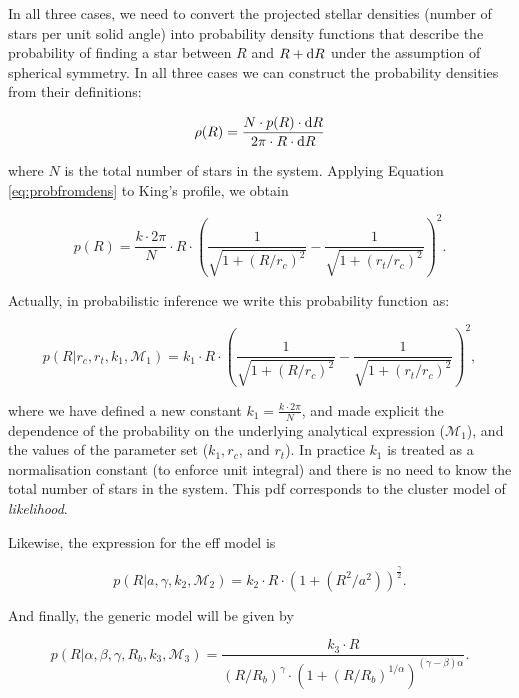 In all three cases, we need to convert the projected stellar densities (number of stars per unit solid angle) into probability density functions that describe the probability of finding a star between $R$ and $R+{\rm d}R$ under the assumption of spherical symmetry. In all three cases we can construct the probability densities from their definitions:

\begin{equation}
\rho(R)=\frac{N\cdot p(R)\cdot {\rm d}R}{2\pi\cdot R\cdot {\rm d}R}
\label{eq:probfromdens}
\end{equation}

where $N$ is the total number of stars in the system. Applying Equation \ref{eq:probfromdens} to King's profile, we obtain

\begin{equation}
  p(R)=\frac{k\cdot2\pi}{N}\cdot R \cdot
  \left(\frac{1}{\sqrt{1+(R/r_c)^2}} - \frac{1}{\sqrt{1+(r_t/r_c)^2}}\right)^2.
\end{equation}

Actually, in probabilistic inference we write this probability function as:

\begin{equation}
  p(R|r_c, r_t, k_1,\mathcal{M}_1)=k_1\cdot R \cdot
  \left(\frac{1}{\sqrt{1+(R/r_c)^2}} - \frac{1}{\sqrt{1+(r_t/r_c)^2}}\right)^2,
\label{eq:probfromdens1}
\end{equation}

where we have defined a new constant $k_1=\frac{k\cdot2\pi}{N}$, and made explicit the dependence of the probability on the underlying analytical expression ($\mathcal{M}_1$), and the values of the parameter set ($k_1, r_c$, and $r_t$). In practice $k_1$ is treated as a normalisation constant (to enforce unit integral) and there is no need to know the total number of stars in the system. This \gls{pdf} corresponds to the cluster model of \emph{likelihood}.

Likewise, the expression for the \gls{eff} model is

\begin{equation}
  p(R|a, \gamma, k_2,\mathcal{M}_2)=k_2\cdot R \cdot (1+(R^2/a^2))^\frac{\gamma}{2}.
\label{eq:probfromdens2}
\end{equation}

And finally, the generic model will be given by

\begin{equation}
  p(R| \alpha, \beta, \gamma, R_b, k_3,\mathcal{M}_3 ) = \frac{k_3\cdot R} {(R/R_b)^{\gamma}\cdot(1+(R/R_b)^{1/\alpha})^{(\gamma-\beta)\alpha}}.
  \label{eq:probfromdens3}
\end{equation}

